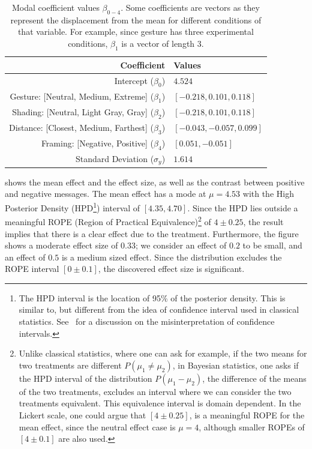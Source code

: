 \begin{table}[htb]%
 \centering
 \caption{Modal coefficient values $\beta_{0-4}$. Some coefficients are vectors as they represent the displacement from the mean for different conditions of that variable. For example, since gesture has three experimental conditions, $\beta_1$ is a vector of length 3.}\label{tab:modal values}
 \begin{tabular}{@{}rl@{}} \toprule
  Coefficient                                       & Values                     \\ \midrule
  Intercept ($\beta_0$)                             & $4.524$                    \\
  Gesture: [Neutral, Medium, Extreme] ($\beta_1$)   & $[-0.218, 0.101, 0.118]$   \\
  Shading: [Neutral, Light Gray, Gray] ($\beta_2$)  & $ [-0.218 , 0.101, 0.118]$ \\
  Distance: [Closest, Medium, Farthest] ($\beta_3$) & $[-0.043, -0.057, 0.099]$  \\
  Framing: [Negative, Positive] ($\beta_4$)         & $[ 0.051, -0.051]$         \\
  Standard Deviation ($\sigma_y$)                   & $1.614$                    \\ \bottomrule
 \end{tabular}
\end{table}


 shows the mean effect and the effect size, as well as the contrast between positive and negative messages. The mean effect has a mode at $\mu=4.53$ with the High Posterior Density (HPD\footnote{The HPD interval is the location of 95\% of the posterior density. This is similar to, but different from the idea of confidence interval used in classical statistics. See~\textcite{Hoekstra2014} for a discussion on the misinterpretation of confidence intervals.}) interval of $[4.35, 4.70]$. Since the HPD lies outside a meaningful ROPE (Region of Practical Equivalence)\footnote{Unlike classical statistics, where one can ask for example, if the two means for two treatments are different $P(\mu_1\neq \mu_2)$, in Bayesian statistics, one asks if the HPD interval of the distribution $P(\mu_1-\mu_2)$, the difference of the means of the two treatments, excludes an interval where we can consider the two treatments equivalent. This equivalence interval is domain dependent. In the Lickert scale, one could argue that $[4 \pm 0.25]$, is a meaningful ROPE for the mean effect, since the neutral effect case is $\mu=4$, although smaller ROPEs of $[4 \pm 0.1]$ are also used.} of $4 \pm 0.25$, the result implies that there is a clear effect due to the treatment. Furthermore, the figure shows a moderate effect size of $0.33$; we consider an effect of $0.2$ to be small, and an effect of $0.5$ is a medium sized effect. Since the distribution excludes the ROPE interval $[0 \pm 0.1]$, the discovered effect size is significant.


